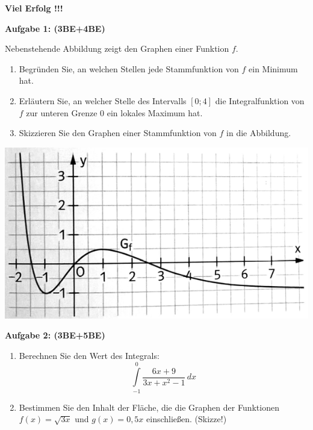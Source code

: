 \documentclass[a4paper,12pt]{article}
\newcommand{\Aufgabe}[1]{
  {
  \vspace*{0.5cm}
  \textsf{\textbf{Aufgabe #1}}
  \vspace*{0.2cm}
  
  }
}
\begin{document}
\vspace{5cm}
\centerline{\huge\bfseries\sffamily Viel Erfolg !!!}

\newpage

\Aufgabe{1: (3BE+4BE)} 

\noindent
\begin{minipage}{0.6\textwidth}%
  Nebenstehende Abbildung zeigt den Graphen einer Funktion $f$.
  \begin{enumerate}[label={\alph*)}] 
    \item Begründen Sie, an welchen Stellen jede Stammfunktion von $f$ ein Minimum hat.
    \item Erläutern Sie, an welcher Stelle des Intervalls $[0;4]$ die Integralfunktion von $f$ zur unteren Grenze 0 ein lokales Maximum hat.
    \item Skizzieren Sie den Graphen einer Stammfunktion von $f$ in die Abbildung.
  \end{enumerate}
\end{minipage}
\hfill%
\begin{minipage}{0.3\textwidth}%
  \includegraphics[width=\linewidth]{Q12_1Klausur_Ana_Sto_v2_NachholTermin_01.png}
\end{minipage}%


\Aufgabe{2: (3BE+5BE)} 
\begin{enumerate}[label={\alph*)}] 
  \item Berechnen Sie den Wert des Integrals:
    \[ \int\limits_{-1}^{0}\frac{6x+9}{3x+x^2-1}\,dx \]
  \item Bestimmen Sie den Inhalt der Fläche, die die Graphen der Funktionen ${f(x)=\sqrt{3x}}$ und $g(x) = 0,5x$ einschließen. (Skizze!)
\end{enumerate}
\end{document}
